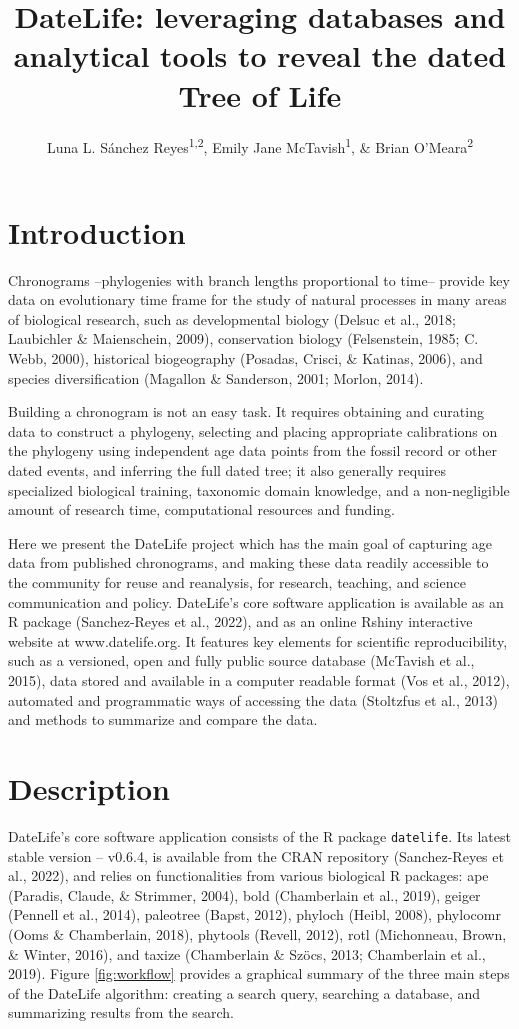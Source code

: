 \documentclass[
  man]{apa6}
\title{DateLife: leveraging databases and analytical tools to reveal the dated Tree of Life}
\author{Luna L. Sánchez Reyes\textsuperscript{1,2}, Emily Jane McTavish\textsuperscript{1}, \& Brian O'Meara\textsuperscript{2}}
\date{}
\affiliation{\vspace{0.5cm}\textsuperscript{1} University of California, Merced\\\textsuperscript{2} University of Tennessee, Knoxville}
\begin{document}
\maketitle

\hypertarget{introduction}{%
\section{Introduction}\label{introduction}}

Chronograms --phylogenies with branch lengths proportional to time-- provide key data on evolutionary time frame for the study of natural processes in many areas of biological research, such as developmental biology (Delsuc et al., 2018; Laubichler \& Maienschein, 2009), conservation biology (Felsenstein, 1985; C. Webb, 2000), historical biogeography (Posadas, Crisci, \& Katinas, 2006), and species diversification (Magallon \& Sanderson, 2001; Morlon, 2014).

Building a chronogram is not an easy task.
It requires obtaining and curating data to construct a phylogeny, selecting and placing appropriate calibrations on the phylogeny using independent age data points from the fossil record or other dated events, and inferring the full dated tree;
it also generally requires specialized biological training, taxonomic domain knowledge, and a non-negligible amount of research time, computational resources and funding.

Here we present the DateLife project which has the main goal of capturing age data from published chronograms, and making these data readily accessible to the community for reuse and reanalysis, for research, teaching, and science communication and policy.
DateLife's core software application is available as an R package (Sanchez-Reyes et al., 2022), and as an online Rshiny interactive website at www.datelife.org. It features key elements for scientific reproducibility, such as a versioned, open and fully public source database (McTavish et al., 2015), data stored and available in a computer readable format (Vos et al., 2012), automated and programmatic ways of accessing the data (Stoltzfus et al., 2013) and methods to summarize and compare the data.

\hypertarget{description}{%
\section{Description}\label{description}}

DateLife's core software application consists of the R package \texttt{datelife}. Its latest stable version -- v0.6.4, is available from the CRAN repository (Sanchez-Reyes et al., 2022), and relies on functionalities from various biological R packages:
ape (Paradis, Claude, \& Strimmer, 2004),
bold (Chamberlain et al., 2019),
geiger (Pennell et al., 2014),
paleotree (Bapst, 2012),
phyloch (Heibl, 2008),
phylocomr (Ooms \& Chamberlain, 2018),
phytools (Revell, 2012),
rotl (Michonneau, Brown, \& Winter, 2016), and
taxize (Chamberlain \& Szöcs, 2013; Chamberlain et al., 2019).
Figure \ref{fig:workflow} provides a graphical summary of the three main steps of the DateLife algorithm: creating a search query, searching a database, and summarizing results from the search.
\end{document}
